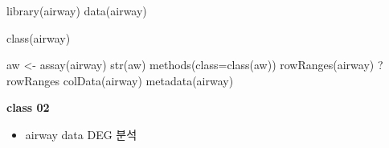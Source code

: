 \documentclass[
]{book}
\newenvironment{Shaded}{\begin{snugshade}}{\end{snugshade}}
\newcommand{\AttributeTok}[1]{\textcolor[rgb]{0.77,0.63,0.00}{#1}}
\newcommand{\FunctionTok}[1]{\textcolor[rgb]{0.00,0.00,0.00}{#1}}
\newcommand{\NormalTok}[1]{#1}
\newcommand{\OtherTok}[1]{\textcolor[rgb]{0.56,0.35,0.01}{#1}}
\providecommand{\tightlist}{%
  \setlength{\itemsep}{0pt}\setlength{\parskip}{0pt}}
\begin{document}
\begin{Shaded}
\begin{Highlighting}[]
\FunctionTok{library}\NormalTok{(airway)}
\FunctionTok{data}\NormalTok{(airway)}


\FunctionTok{class}\NormalTok{(airway)}

\NormalTok{aw }\OtherTok{\textless{}{-}} \FunctionTok{assay}\NormalTok{(airway)}
\FunctionTok{str}\NormalTok{(aw)}
\FunctionTok{methods}\NormalTok{(}\AttributeTok{class=}\FunctionTok{class}\NormalTok{(aw))}
\FunctionTok{rowRanges}\NormalTok{(airway)}
\NormalTok{?rowRanges}
\FunctionTok{colData}\NormalTok{(airway)}
\FunctionTok{metadata}\NormalTok{(airway)}
\end{Highlighting}
\end{Shaded}

\textbf{class 02}

\begin{itemize}
\tightlist
\item
  airway data DEG 분석
\end{itemize}
\end{document}
